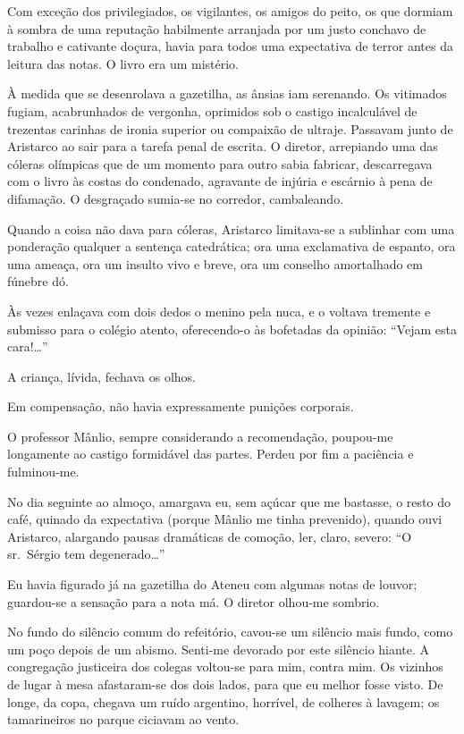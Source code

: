 Com exceção dos privilegiados, os vigilantes,
os amigos do peito, os que dormiam à sombra de uma reputação habilmente
arranjada por um justo conchavo de trabalho e cativante doçura, havia
para todos uma expectativa de terror antes da leitura das notas. O
livro era um mistério. 


À medida que se desenrolava a gazetilha, as
ânsias iam serenando. Os vitimados fugiam, acabrunhados de vergonha,
oprimidos sob o castigo incalculável de trezentas carinhas de ironia
superior ou compaixão de ultraje. Passavam junto de Aristarco ao sair
para a tarefa penal de escrita. O diretor, arrepiando uma das cóleras
olímpicas que de um momento para outro sabia fabricar, descarregava com
o livro às costas do condenado, agravante de injúria e escárnio à pena
de difamação. O desgraçado sumia{}-se no corredor, cambaleando. 

Quando a coisa não dava para cóleras, Aristarco limitava{}-se a sublinhar com
uma ponderação qualquer a sentença catedrática; ora uma exclamativa de
espanto, ora uma ameaça, ora um insulto vivo e breve, ora um conselho
amortalhado em fúnebre dó. 

Às vezes enlaçava com dois dedos o menino
pela nuca, e o voltava tremente e submisso para o colégio atento,
oferecendo{}-o às bofetadas da opinião: ``Vejam esta cara!\ldots'' 

A criança, lívida, fechava os olhos. 

Em compensação, não havia expressamente punições corporais. 

O professor Mânlio, sempre
considerando a recomendação, poupou{}-me longamente ao castigo
formidável das partes. Perdeu por fim a paciência e fulminou{}-me. 

No dia seguinte ao almoço, amargava eu, sem açúcar que me bastasse, o
resto do café, quinado da expectativa (porque Mânlio me tinha
prevenido), quando ouvi Aristarco, alargando pausas dramáticas de
comoção, ler, claro, severo: ``O sr.~Sérgio tem degenerado\ldots'' 

Eu havia figurado já na gazetilha do Ateneu com algumas notas de louvor;
guardou{}-se a sensação para a nota má. O diretor olhou{}-me sombrio.

No fundo do silêncio comum do refeitório, cavou{}-se um silêncio mais
fundo, como um poço depois de um abismo. Senti{}-me devorado por este
silêncio hiante. A congregação justiceira dos colegas voltou{}-se para
mim, contra mim. Os vizinhos de lugar à mesa afastaram{}-se dos dois
lados, para que eu melhor fosse visto. De longe, da copa, chegava um
ruído argentino, horrível, de colheres à lavagem; os tamarineiros no
parque ciciavam ao vento. 

